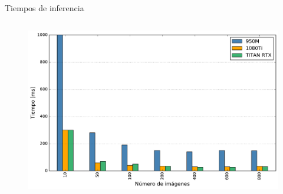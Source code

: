 \begin{frame}{Tiempos de inferencia}
\begin{columns}
	\begin{figure}[H]
	\centering
 \includegraphics[width=1\textwidth]{barplot/digits.pdf}
	\end{figure}
	\end{columns}
 
\end{frame}



